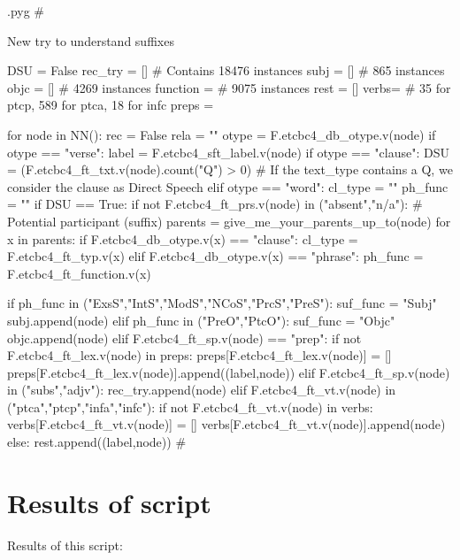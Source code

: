 \documentclass{report}
\makeatletter
\newenvironment{python}{%
  \VerbatimEnvironment
  \minted@resetoptions
  \setkeys{minted@opt}{}
      \begin{VerbatimOut}{\jobname.pyg}}
{%
      \end{VerbatimOut}
      \minted@pygmentize{python}
      \DeleteFile{\jobname.pyg}}
\makeatother
\begin{document}
\begin{python}
#{{{ New try to understand suffixes

DSU = False
rec_try = []    # Contains 18476 instances
subj = []       # 865 instances
objc = []       # 4269 instances
function = {}   # 9075 instances
rest = []
verbs= {}       # 35 for ptcp, 589 for ptca, 18 for infc
preps = {}

for node in NN():
    rec = False
    rela = ""
    otype = F.etcbc4_db_otype.v(node)
    if otype == "verse":
        label = F.etcbc4_sft_label.v(node)
    if otype == "clause":
        DSU = (F.etcbc4_ft_txt.v(node).count("Q") > 0)    # If the text_type contains a Q, we consider the clause as Direct Speech
    elif otype == "word":
        cl_type = ""
        ph_func = ""
        if DSU == True:
            if not F.etcbc4_ft_prs.v(node) in ("absent","n/a"):    # Potential participant (suffix)
                parents = give_me_your_parents_up_to(node)
                for x in parents:
                    if F.etcbc4_db_otype.v(x) == "clause":
                        cl_type = F.etcbc4_ft_typ.v(x)
                    elif F.etcbc4_db_otype.v(x) == "phrase":
                        ph_func = F.etcbc4_ft_function.v(x)

                if ph_func in ("ExsS","IntS","ModS","NCoS","PrcS","PreS"):
                    suf_func = "Subj"
                    subj.append(node)
                elif ph_func in ("PreO","PtcO"):
                    suf_func = "Objc"
                    objc.append(node)
                elif F.etcbc4_ft_sp.v(node) == "prep":
                    if not F.etcbc4_ft_lex.v(node) in preps:
                        preps[F.etcbc4_ft_lex.v(node)] = []
                    preps[F.etcbc4_ft_lex.v(node)].append((label,node))
                elif F.etcbc4_ft_sp.v(node) in ("subs","adjv"):
                    rec_try.append(node)
                elif F.etcbc4_ft_vt.v(node) in ("ptca","ptcp","infa","infc"):
                    if not F.etcbc4_ft_vt.v(node) in verbs:
                        verbs[F.etcbc4_ft_vt.v(node)] = []
                    verbs[F.etcbc4_ft_vt.v(node)].append(node)
                else:
                    rest.append((label,node))
#}}}
\end{python}

\section{Results of script}
Results of this script:
\end{document}
